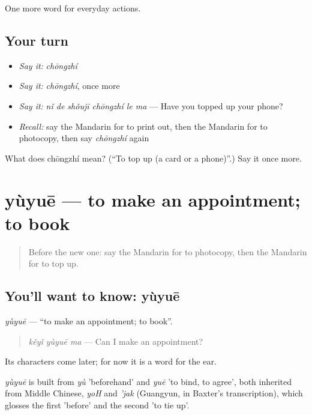 \begin{grammarlens}[title={What you've built}]
One more word for everyday actions.
\end{grammarlens}

\subsection*{Your turn}
\begin{itemize}
\raggedright
  \item \emph{Say it:} \emph{chōngzhí}
  \item \emph{Say it:} \emph{chōngzhí}, once more
  \item \emph{Say it:} \emph{nǐ de shǒujī chōngzhí le ma} — Have you topped up your phone?
  \item \emph{Recall:} say the Mandarin for to print out, then the Mandarin for to photocopy, then say \emph{chōngzhí} again
\end{itemize}

\begin{tcolorbox}[breakable,colback=teal!4,colframe=teal!35!black,title={Before you move on}]
What does chōngzhí mean? (\textquotedblleft{}To top up (a card or a phone)\textquotedblright{}.) Say it once more.
\end{tcolorbox}
\section[yùyuē]{yùyuē — to make an appointment; to book}

\label{lesson:ZH-C212-yuyue}



\begin{quote}
Before the new one: say the Mandarin for to photocopy, then the Mandarin for to top up.
\end{quote}

\subsection*{You'll want to know: yùyuē}
\emph{yùyuē} — \textquotedblleft{}to make an appointment; to book\textquotedblright{}.

\begin{quote}
\emph{kěyǐ yùyuē ma} — Can I make an appointment?
\end{quote}

Its characters come later; for now it is a word for the ear.

\begin{cousinweb}
\emph{yùyuē} is built from \emph{yù} 'beforehand' and \emph{yuē} 'to bind, to agree', both inherited from Middle Chinese, \emph{yoH} and \emph{'jak} (Guangyun, in Baxter's transcription), which glosses the first 'before' and the second 'to tie up'.
\end{cousinweb}

